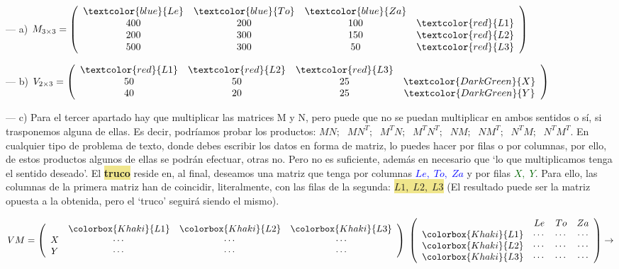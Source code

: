 \begin{proofw}\renewcommand{\qedsymbol}{$\diamond$}
	
	
--- a)	$M_{3 \times 3}= \left( \begin{array}{cccc} \textcolor{blue}{Le}&\textcolor{blue}{To}&\textcolor{blue}{Za}& \\400&200&100&\textcolor{red}{L1}\\200&300&150&\textcolor{red}{L2}\\500&300&50&\textcolor{red}{L3}   \end{array} \right) $

--- b) $V_{2 \times 3}=\left( \begin{array}{cccc} \textcolor{red}{L1}&\textcolor{red}{L2}&\textcolor{red}{L3}& \\50&50&25&\textcolor{DarkGreen}{X}\\40&20&25&\textcolor{DarkGreen}{Y}   \end{array} \right)$

--- c) Para el tercer apartado hay que multiplicar las matrices M y N, pero puede que no se puedan multiplicar en ambos sentidos o sí, si trasponemos alguna de ellas. Es decir, podríamos probar los productos: $MN;$ $\; MN^T;$ $\; M^TN;$ $\; M^TN^T;$ $\; NM;$ $\; NM^T;$ $\; N^TM;$ $\; N^TM^T$. En cualquier tipo de problema de texto, donde debes escribir los datos en forma de matriz, lo puedes hacer por filas o por columnas, por ello, de estos productos algunos de ellas se podrán efectuar, otras no. Pero no es suficiente, además en necesario que `lo que multiplicamos tenga el sentido deseado'. El \colorbox{Khaki}{\textbf{truco}} reside en, al final, deseamos una matriz que tenga por columnas  \textcolor{blue}{$Le,\;  To, \; Za$} y por filas  \textcolor{DarkGreen}{$X, \; Y$}. Para ello, las columnas de la primera matriz han de coincidir, literalmente, con las filas de la segunda: \colorbox{Khaki}{$L1,\; L2,\; L3$} (El resultado puede ser la matriz opuesta a la obtenida, pero el `truco' seguirá siendo el mismo).

$VM=\left( \begin{array}{cccc} &\colorbox{Khaki}{L1}&\colorbox{Khaki}{L2}&\colorbox{Khaki}{L3}\\
X&\cdots&\cdots&\cdots \\ Y&\cdots&\cdots& \cdots  \end{array} \right)\; 
\left( \begin{array}{cccc} &Le&To&Za \\ \colorbox{Khaki}{L1}&\cdots&\cdots&\cdots \\\colorbox{Khaki}{L2}&\cdots&\cdots&\cdots \\ \colorbox{Khaki}{L3}&\cdots&\cdots&\cdots   \end{array}\right) \to $


\end{proofw}
